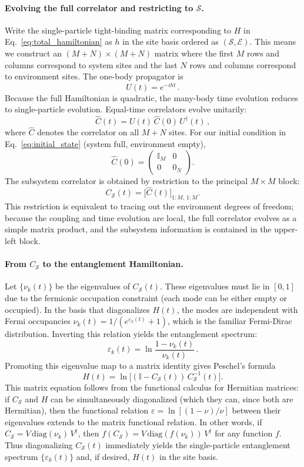 \documentclass[12pt,oneside,openright]{report}
\theoremstyle{definition}
\theoremstyle{plain}
\theoremstyle{remark}
\newcommand{\beq}{\begin{equation}}
\newcommand{\eeq}{\end{equation}}
\begin{document}
\paragraph{Evolving the full correlator and restricting to \(\mathcal{S}\).}
Write the single-particle tight-binding matrix corresponding to \(H\) in Eq.~\eqref{eq:total_hamiltonian} as \(h\) in the site basis ordered as \((\mathcal{S},\mathcal{E})\). This means we construct an $(M+N) \times (M+N)$ matrix where the first $M$ rows and columns correspond to system sites and the last $N$ rows and columns correspond to environment sites. The one-body propagator is
\beq
 U(t)=e^{-i h t}\,.
 \label{eq:U_t}
\eeq
Because the full Hamiltonian is quadratic, the many-body time evolution reduces to single-particle evolution. Equal-time correlators evolve unitarily:
\beq
 \hat C(t)=U(t)\, \hat C(0)\, U^\dagger(t)\,,
 \label{eq:C_full_evolve}
\eeq
where \(\hat C\) denotes the correlator on all \(M{+}N\) sites. For our initial condition in Eq.~\eqref{eq:initial_state} (system full, environment empty),
\beq
 \hat C(0)=
 \begin{pmatrix}
 \mathbb{I}_M & 0\\
 0 & 0_N
 \end{pmatrix}.
 \label{eq:C0_block}
\eeq
The subsystem correlator is obtained by restriction to the principal \(M\times M\) block:
\beq
 C_{\mathcal{S}}(t)=\big[\hat C(t)\big]_{1:M,\,1:M}.
 \label{eq:restrict}
\eeq
This restriction is equivalent to tracing out the environment degrees of freedom; because the coupling and time evolution are local, the full correlator evolves as a simple matrix product, and the subsystem information is contained in the upper-left block.

\paragraph{From \(C_{\mathcal{S}}\) to the entanglement Hamiltonian.}
Let \(\{\nu_k(t)\}\) be the eigenvalues of \(C_{\mathcal{S}}(t)\). These eigenvalues must lie in \([0,1]\) due to the fermionic occupation constraint (each mode can be either empty or occupied). In the basis that diagonalizes \(H(t)\), the modes are independent with Fermi occupancies \(\nu_k(t)=1/(e^{\varepsilon_k(t)}+1)\), which is the familiar Fermi-Dirac distribution. Inverting this relation yields the entanglement spectrum:
\beq
 \varepsilon_k(t)=\ln\!\frac{1-\nu_k(t)}{\nu_k(t)}\,.
 \label{eq:eps_from_nu}
\eeq
Promoting this eigenvalue map to a matrix identity gives Peschel’s formula
\beq
 H(t)=\ln\!\Big[(\mathbb{I}-C_{\mathcal{S}}(t))\, C_{\mathcal{S}}^{-1}(t)\Big].
 \label{eq:peschel_H}
\eeq
This matrix equation follows from the functional calculus for Hermitian matrices: if $C_{\mathcal{S}}$ and $H$ can be simultaneously diagonalized (which they can, since both are Hermitian), then the functional relation $\varepsilon = \ln[(1-\nu)/\nu]$ between their eigenvalues extends to the matrix functional relation. In other words, if $C_{\mathcal{S}} = V \,\mathrm{diag}(\nu_k)\, V^\dagger$, then $f(C_{\mathcal{S}}) = V\, \mathrm{diag}(f(\nu_k))\, V^\dagger$ for any function $f$. Thus diagonalizing \(C_{\mathcal{S}}(t)\) immediately yields the single-particle entanglement spectrum \(\{\varepsilon_k(t)\}\) and, if desired, \(H(t)\) in the site basis.
\end{document}
